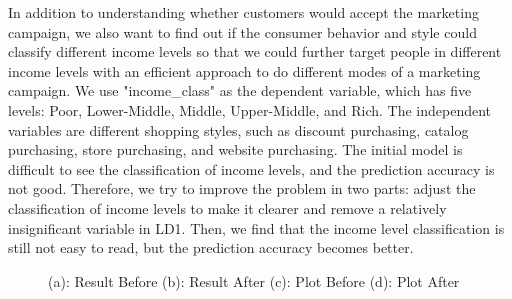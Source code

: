 \documentclass[11pt]{article} %
\begin{document}
\quad In addition to understanding whether customers would accept the marketing campaign, we also want to find out if the consumer behavior and style could classify different income levels so that we could further target people in different income levels with an efficient approach to do different modes of a marketing campaign. We use "income\_class" as the dependent variable, which has five levels: Poor, Lower-Middle, Middle, Upper-Middle, and Rich. The independent variables are different shopping styles, such as discount purchasing, catalog purchasing, store purchasing, and website purchasing. The initial model is difficult to see the classification of income levels, and the prediction accuracy is not good. Therefore, we try to improve the problem in two parts: adjust the classification of income levels to make it clearer and remove a relatively insignificant variable in LD1. Then, we find that the income level classification is still not easy to read, but the prediction accuracy becomes better.
\begin{figure}[H]
    \centering
    \caption{(a): Result Before  (b): Result After (c): Plot Before (d): Plot After}
    \label{fig:foobar}
\end{figure}
\end{document}
